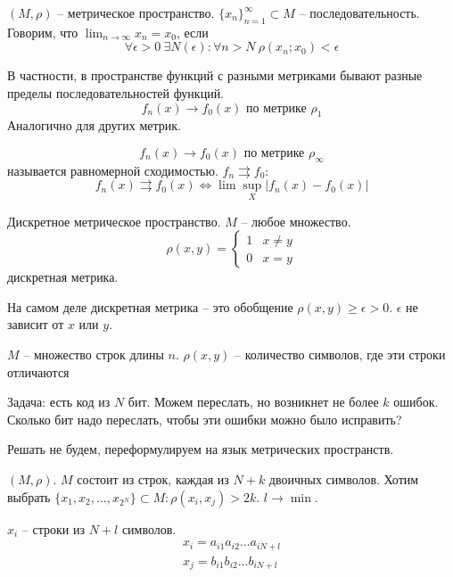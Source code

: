 \documentclass[main]{subfiles}
\begin{document}
\begin{definition}
    $(M, \rho)$ -- метрическое пространство. $\{x_n\}^\infty_{n=1} \subset M$ -- последовательность.
    Говорим, что $\lim_{n\to\infty} x_n = x_0$, если
    \[\forall \epsilon>0 \ \exists N(\epsilon): \forall n > N \ \rho(x_n; x_0) < \epsilon\]
\end{definition}

В частности, в пространстве функций с разными метриками бывают разные пределы последовательностей функций.
\[f_n(x) \to f_0(x) \text{ по метрике } \rho_1\]
Аналогично для других метрик.

\[f_n(x) \to f_0(x) \text{ по метрике } \rho_\infty\]
называется равномерной сходимостью. $f_n \rightrightarrows f_0$:
\[f_n(x) \rightrightarrows f_0(x) \Leftrightarrow \lim \sup_X |f_n(x) - f_0(x)|\]

\begin{example}
    Дискретное метрическое пространство. $M$ -- любое множество.
    \[\rho(x,y) = \begin{cases}
            1 & x \neq y \\
            0 & x =y
        \end{cases}\]
    дискретная метрика.
\end{example}

\begin{example}
    На самом деле дискретная метрика -- это обобщение $\rho(x,y) \ge \epsilon >0$.
    $\epsilon$ не зависит от $x$ или $y$.
\end{example}

\begin{example}
    $M$ -- множество строк длины $n$. $\rho(x,y)$ -- количество символов, где эти
    строки отличаются
\end{example}

\begin{example}
    Задача: есть код из $N$ бит. Можем переслать, но возникнет не более $k$ ошибок.
    Сколько бит надо переслать, чтобы эти ошибки можно было исправить?

    Решать не будем, переформулируем на язык метрических пространств.

    $(M,\rho)$. $M$ состоит из строк, каждая из $N+k$ двоичных символов.
    Хотим выбрать $\{x_1, x_2,..., x_{2^N}\} \subset M: \rho(x_i, x_j) > 2k$.
    $l \to \min$.

    $x_i$ -- строки из $N+l$ символов.
    \begin{gather*}
        x_i = a_{i1}a_{i2}...a_{iN+l}\\
        x_j = b_{i1}b_{i2}...b_{iN+l}
    \end{gather*}
\end{example}
\end{document}
